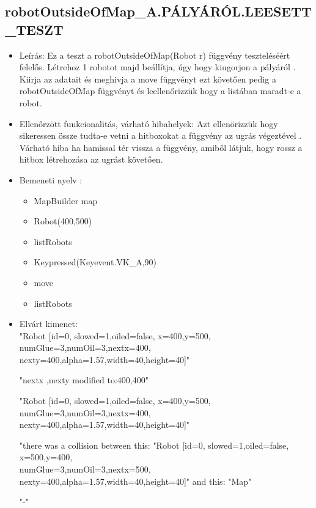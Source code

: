 \subsection{robotOutsideOfMap\_A.PÁLYÁRÓL.LEESETT\_TESZT}
\begin{itemize}
	\item Leírás: Ez a teszt a robotOutsideOfMap(Robot r) függvény teszteléséért felelős.
			Létrehoz 1 robotot majd beállítja, úgy hogy kiugorjon a pályáról .
			Kiirja az adatait  és meghivja a move függvényt ezt követően pedig a robotOutsideOfMap függvényt és leellenőrizzük hogy a listában maradt-e a robot.	\newline
	\item Ellenőrzött funkcionalitás, várható hibahelyek: Azt ellenörizzük hogy sikeressen össze tudta-e vetni a hitboxokat a függvény az ugrás végeztével .
	Várható hiba ha hamissal tér vissza a függvény, amiből látjuk, hogy rossz a hitbox létrehozása  az ugrást követően.
	\item Bemeneti nyelv :
		\begin{itemize}
\item MapBuilder map
		\item Robot(400,500)
		\item listRobots
		\item Keypressed(Keyevent.VK\_A,90)
		\item move
		\item listRobots
		\end{itemize}

	\item Elvárt kimenet: \\
		"Robot [id=0,  slowed=1,oiled=false, x=400,y=500, 
		\\numGlue=3,numOil=3,nextx=400,
		\\nexty=400,alpha=1.57,width=40,height=40]"\newline
		
		"nextx ,nexty modified to:400,400"\newline
	
		"Robot [id=0,  slowed=1,oiled=false, x=400,y=500, 
		\\numGlue=3,numOil=3,nextx=400,
		\\nexty=400,alpha=1.57,width=40,height=40]"\newline
		 
		 "there was a collision between this: "Robot [id=0,  slowed=1,oiled=false, x=500,y=400, 
		\\numGlue=3,numOil=3,nextx=500,
		\\nexty=400,alpha=1.57,width=40,height=40]"\newline
		and this:
		"Map"\newline
		
	    "-"\newline 
\end{itemize}

